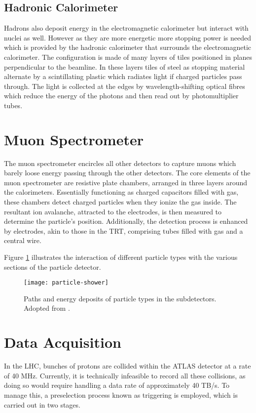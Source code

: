 \subsection{Hadronic Calorimeter}

Hadrons also deposit energy in the electromagnetic calorimeter but interact with nuclei as well. However as they are more energetic more stopping power is needed which is provided by the hadronic calorimeter that surrounds the electromagnetic calorimeter. The configuration is made of many layers of tiles positioned in planes perpendicular to the beamline. In these layers tiles of steel as stopping material alternate by a scintillating plastic which radiates light if charged particles pass through. The light is collected at the edges by wavelength-shifting optical fibres  which reduce the energy of the photons and then read out by photomultiplier tubes.

\section{Muon Spectrometer}

The muon spectrometer encircles all other detectors to capture muons which barely loose energy passing through the other detectors. The core elements of the muon spectrometer are resistive plate chambers, arranged in three layers around the calorimeters. Essentially functioning as charged capacitors filled with gas, these chambers detect charged particles when they ionize the gas inside. The resultant ion avalanche, attracted to the electrodes, is then measured to determine the particle's position. Additionally, the detection process is enhanced by electrodes, akin to those in the \ac{TRT}, comprising tubes filled with gas and a central wire.

Figure \ref{fig:particles_in_detector} illustrates the interaction of different particle types with the various sections of the particle detector. 
\begin{figure}
    \centering
    \texttt{[image: particle-shower]}
    \caption[]{Paths and energy deposits of particle types in the subdetectors. Adopted from \citep{Guth:2765038}.}
    \label{fig:particles_in_detector}
\end{figure}

\section{Data Acquisition}\label{sec:tdaq}
In the \ac{LHC}, bunches of protons are collided within the \ac{ATLAS} detector at a rate of 40 MHz. Currently, it is technically infeasible to record all these collisions, as doing so would require handling a data rate of approximately 40 TB/s. To manage this, a preselection process known as triggering is employed, which is carried out in two stages.

